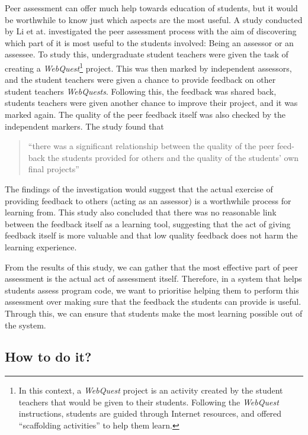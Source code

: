\documentclass[a4paper,11pt]{report}
\begin{document}
Peer assessment can offer much help towards education of students, but it would be worthwhile to know just which aspects are the most useful. A study conducted by Li et at. \cite{li_assessor_2010} investigated the peer assessment process with the aim of discovering which part of it is most useful to the students involved: Being an assessor or an assessee. To study this, undergraduate student teachers were given the task of creating a \textit{WebQuest}\footnote{In this context, a \textit{WebQuest} project is an activity created by the student teachers that would be given to their students. Following the \textit{WebQuest} instructions, students are guided through Internet resources, and offered ``scaffolding activities'' to help them learn.} project. This was then marked by independent assessors, and the student teachers were given a chance to provide feedback on other student teachers \textit{WebQuests}. Following this, the feedback was shared back, students teachers were given another chance to improve their project, and it was marked again. The quality of the peer feedback itself was also checked by the independent markers. The study found that 
\begin{quote}
``there was a significant relationship between the quality of the peer feed-back the students provided for others and the quality of the students' own final projects''
\end{quote}
The findings of the investigation would suggest that the actual exercise of providing feedback to others (acting as an assessor) is a worthwhile process for learning from. This study also concluded that there was no reasonable link between the feedback itself as a learning tool, suggesting that the act of giving feedback itself is more valuable and that low quality feedback does not harm the learning experience.\par
From the results of this study, we can gather that the most effective part of peer assessment is the actual act of assessment itself. Therefore, in a system that helps students assess program code, we want to prioritise helping them to perform this assessment over making sure that the feedback the students can provide is useful. Through this, we can ensure that students make the most learning possible out of the system.


\subsection{How to do it?}
\end{document}
